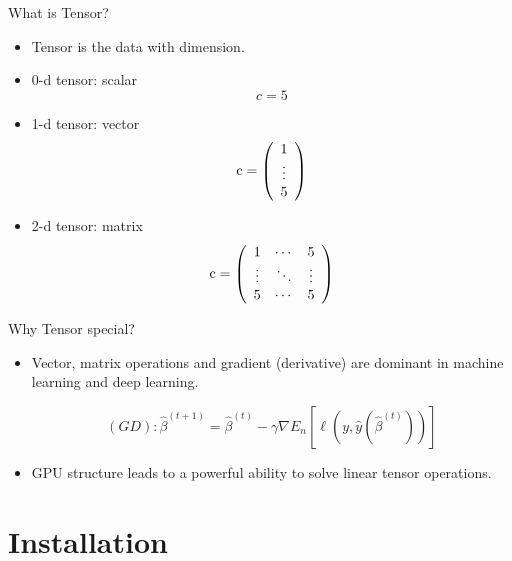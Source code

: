 \documentclass{beamer}
\begin{document}
\begin{frame}[fragile]{What is Tensor?}
\begin{itemize}
	\item Tensor is the data with dimension.
	\item 0-d tensor: scalar
	\begin{equation*}
	c = 5
	\end{equation*} 
	\item 1-d tensor: vector
	\begin{equation*}
	{\rm{c}} = \left( {\begin{array}{*{20}{c}}
1\\
 \vdots \\
5
\end{array}} \right)
	\end{equation*} 
	\item 2-d tensor: matrix
	\begin{equation*}
	{\rm{c}} = \left( {\begin{array}{*{20}{c}}
1& \cdots &5\\
 \vdots & \ddots & \vdots \\
5& \cdots &5
\end{array}} \right)
	\end{equation*}
\end{itemize}
\end{frame}


\begin{frame}[fragile]{Why Tensor special?}
\begin{itemize}
	\item Vector, matrix operations and gradient (derivative) are dominant in machine learning and deep learning.
	\begin{example}
	\begin{equation*}
	\left( {GD} \right):{\hat \beta ^{\left( {t + 1} \right)}} = {\hat \beta ^{\left( t \right)}} - \gamma \nabla {E_n}\left[ {\ell \left( {y,\hat y\left( {{{\hat \beta }^{\left( t \right)}}} \right)} \right)} \right]
	\end{equation*}
	\end{example}
	\item GPU structure leads to a powerful ability to solve linear tensor operations.
\end{itemize}
\end{frame}

\section{Installation}
\end{document}
